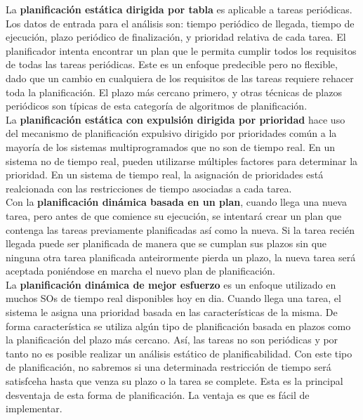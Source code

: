 \documentclass{article}
\begin{document}
				La \textbf{planificación estática dirigida por tabla} es aplicable a tareas periódicas. Los datos de entrada para el análisis son: tiempo periódico de llegada, tiempo de ejecución, plazo periódico de finalización, y prioridad relativa de cada tarea. El planificador intenta encontrar un plan que le permita cumplir todos los requisitos de todas las tareas periódicas. Este es un enfoque predecible pero no flexible, dado que un cambio en cualquiera de los requisitos de las tareas requiere rehacer toda la planificación. El plazo más cercano primero, y otras técnicas de plazos periódicos son típicas de esta categoría de algoritmos de planificación. \\
				
				La \textbf{planificación estática con expulsión dirigida por prioridad} hace uso del mecanismo de planificación expulsivo dirigido por prioridades común a la mayoría de los sistemas multiprogramados que no son de tiempo real. En un sistema no de tiempo real, pueden utilizarse múltiples factores para determinar la prioridad. En un sistema de tiempo real, la asignación de prioridades está realcionada con las restricciones de tiempo asociadas a cada tarea. \\
				
				Con la \textbf{planificación dinámica basada en un plan}, cuando llega una nueva tarea, pero antes de que comience su ejecución, se intentará crear un plan que contenga las tareas previamente planificadas así como la nueva. Si la tarea recién llegada puede ser planificada de manera que se cumplan sus plazos sin que ninguna otra tarea planificada anteirormente pierda un plazo, la nueva tarea será aceptada poniéndose en marcha el nuevo plan de planificación. \\
				
				La \textbf{planificación dinámica de mejor esfuerzo} es un enfoque utilizado en muchos SOs de tiempo real disponibles hoy en dia. Cuando llega una tarea, el sistema le asigna una prioridad basada en las características de la misma. De forma característica se utiliza algún tipo de planificación basada en plazos como la planificación del plazo más cercano. Así, las tareas no son periódicas y por tanto no es posible realizar un análisis estático de planificabilidad. Con este tipo de planificación, no sabremos si una determinada restricción de tiempo será satisfceha hasta que venza su plazo o la tarea se complete. Esta es la principal desventaja de esta forma de planificación. La ventaja es que es fácil de implementar.
		
\end{document}

